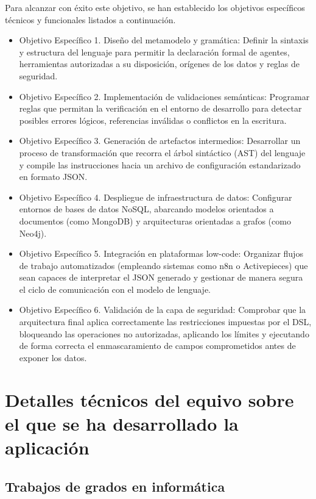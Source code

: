 \documentclass[12pt,twoside,titlepage]{report}
\begin{document}
Para alcanzar con éxito este objetivo, se han establecido los objetivos específicos técnicos y funcionales listados a continuación.

\begin{itemize}
  \item Objetivo Específico 1. Diseño del metamodelo y gramática: Definir la sintaxis y estructura del lenguaje para permitir la declaración formal de agentes, herramientas autorizadas a su disposición, orígenes de los datos y reglas de seguridad. 
  \item Objetivo Específico 2. Implementación de validaciones semánticas: Programar reglas que permitan la verificación en el entorno de desarrollo para detectar posibles errores lógicos, referencias inválidas o conflictos en la escritura.
  \item Objetivo Específico 3. Generación de artefactos intermedios: Desarrollar un proceso de transformación que recorra el árbol sintáctico (AST) del lenguaje y compile las instrucciones hacia un archivo de configuración estandarizado en formato JSON.
  \item Objetivo Específico 4. Despliegue de infraestructura de datos: Configurar entornos de bases de datos NoSQL, abarcando modelos orientados a documentos (como MongoDB) y arquitecturas orientadas a grafos (como Neo4j).
  \item Objetivo Específico 5. Integración en plataformas low-code: Organizar flujos de trabajo automatizados (empleando sistemas como n8n o Activepieces) que sean capaces de interpretar el JSON generado y gestionar de manera segura el ciclo de comunicación con el modelo de lenguaje.
  \item Objetivo Específico 6. Validación de la capa de seguridad: Comprobar que la arquitectura final aplica correctamente las restricciones impuestas por el DSL, bloqueando las operaciones no autorizadas, aplicando los límites y ejecutando de forma correcta el enmascaramiento de campos comprometidos antes de exponer los datos.
\end{itemize}


\section{Detalles técnicos del equivo sobre el que se ha desarrollado la aplicación}

\subsection{Trabajos de grados en informática}
\end{document}
